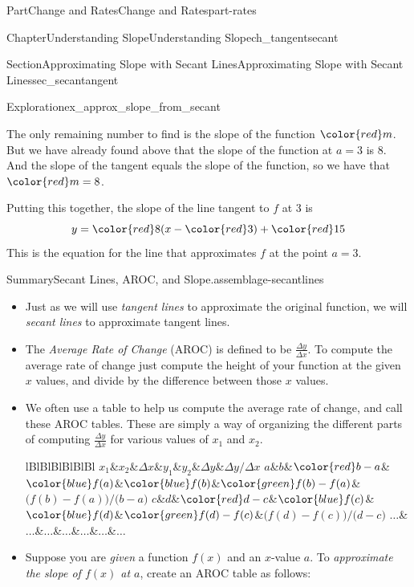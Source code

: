\documentclass{tufte-book}
\newcommand{\tabularfont}{\relax}
\numberwithin{equation}{chapter}
\newcommand{\hrulemedium}{\noalign{\hrule height 0.07em}}
\begin{document}
\begin{partptx}{Part}{Change and Rates}{}{Change and Rates}{}{}{part-rates}
\begin{chapterptx}{Chapter}{Understanding Slope}{}{Understanding Slope}{}{}{ch_tangentsecant}
\begin{sectionptx}{Section}{Approximating Slope with Secant Lines}{}{Approximating Slope with Secant Lines}{}{}{sec_secantangent}
\begin{exploration}{Exploration}{}{ex_approx_slope_from_secant}
\begin{enumerate}[font=\bfseries,label=(\alph*),ref=\alph*]
\par
The only remaining number to find is the slope of the function \(\color{red} m\).  But we have already found above that the slope of the function at \(a=3\) is \(8\).  And the slope of the tangent equals the slope of the function, so we have that \(\color{red} m = 8\).%
\par
Putting this together, the slope of the line tangent to \(f\) at 3 is%
\begin{equation*}
y = {\color{red} 8 }( x - {\color{red} 3}) + {\color{red} 15}
\end{equation*}
This is the equation for the line that approximates \(f\) at the point \(a=3\).%
\end{enumerate}%
\end{exploration}%
\begin{assemblage}{Summary}{Secant Lines, AROC, and Slope.}{assemblage-secantlines}%
%
\begin{itemize}[label=\textbullet]
\item{}Just as we will use \emph{tangent lines} to approximate the original function, we will \emph{secant lines} to approximate tangent lines.%
\item{}The \emph{Average Rate of Change} (AROC) is defined to be \(\frac{\Delta y}{\Delta x}\). To compute the average rate of change just compute the height of your function at the given \(x\) values, and divide by the difference between those \(x\) values.%
\item{}We often use a table to help us compute the average rate of change, and call these AROC tables.  These are simply a way of organizing the different parts of computing   \(\frac{\Delta y}{\Delta x}\) for various values of \(x_1\) and \(x_2\).%
\begin{center}%
{\tabularfont%
\begin{tabular}{lBlBlBlBlBlBl}
\(x_1\)&\(x_2\)&\(\Delta x\)&\(y_1\)&\(y_2\)&\(\Delta y\)&\(\Delta y/\Delta x\)\tabularnewline\hrulemedium
\(a\)&\(b\)&\(\color{red} b-a\)&\(\color{blue} f(a) \)&\(\color{blue} f(b) \)&\(\color{green} f(b) - f(a) \)&\(\Big(f(b) - f(a)\Big)/\Big(b-a\Big) \)\tabularnewline\hrulemedium
\(c\)&\(d\)&\(\color{red} d-c\)&\(\color{blue} f(c) \)&\(\color{blue} f(d) \)&\(\color{green} f(d) - f(c) \)&\(\Big(f(d) - f(c)\Big)/\Big(d-c\Big) \)\tabularnewline\hrulemedium
\(\dots\)&\(\dots\)&\(\dots\)&\(\dots\)&\(\dots\)&\(\dots\)&\(\dots\)
\end{tabular}
}%
\end{center}%
\item{}Suppose you are \emph{given} a function \(f(x)\) and an \(x\)-value \(a\). To \emph{approximate the slope of \(f(x)\) at \(a\)}, create an AROC table as follows:%

\end{itemize}
\end{assemblage}
\end{sectionptx}
\end{chapterptx}
\end{partptx}
\end{document}
